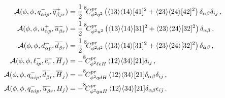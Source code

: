 \begin{align}
    \\
    \mathcal A(\phi,\phi,q^-_{\alpha ip},\overline q^+_{\beta jr}) &= \frac{1}{2}\,\coef{8}{\phi^2 q^2}{pr}\left(\agl{1}{3}\agl{1}{4}\sqr{4}{1}^2 + \agl{2}{3}\agl{2}{4}\sqr{4}{2}^2\right)\delta_{\alpha\beta}\delta_{ij}\,,
    \\
    \mathcal A(\phi,\phi,u^+_{\alpha p},\overline u^-_{\beta r}) &= \frac{1}{2}\,\coef{8}{\phi^2 u^2}{pr}\left(\agl{1}{3}\agl{1}{4}\sqr{3}{1}^2 + \agl{2}{3}\agl{2}{4}\sqr{3}{2}^2\right)\delta_{\alpha\beta}\,,
    \\
    \mathcal A(\phi,\phi,d^+_{\alpha p},\overline d^-_{\beta r}) &= \frac{1}{2}\,\coef{8}{\phi^2 d^2}{pr}\left(\agl{1}{3}\agl{1}{4}\sqr{3}{1}^2 + \agl{2}{3}\agl{2}{4}\sqr{3}{2}^2\right)\delta_{\alpha\beta}\,,
    \\
    \mathcal A(\phi,\phi,\ell^-_{ip},\overline e^-_{r},\overline H_j) &= -\coef{8}{\phi^2\ell e H}{pr}\,\agl{1}{2}\agl{3}{4}\sqr{2}{1}\delta_{ij}\,,
    \\
    \mathcal A(\phi,\phi,q^-_{\alpha ip},\overline d^-_{\beta r},\overline H_j) &= -\coef{8}{\phi^2qd H}{pr}\,\agl{1}{2}\agl{3}{4}\sqr{2}{1}\delta_{\alpha\beta}\delta_{ij}\,,
    \\
    \mathcal A(\phi,\phi,q^-_{\alpha ip},\overline u^-_{\beta r}, H_j) &= -\coef{8}{\phi^2qu H}{pr}\,\agl{1}{2}\agl{3}{4}\sqr{2}{1}\delta_{\alpha\beta}\epsilon_{ij}\,.
\end{align}